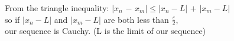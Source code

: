 \documentclass[preview]{standalone}
\begin{document}
\begin{center}
From the triangle inequality: $|$$x_n$ $-$ $x_m$$|$$\leq$$|$$x_n - L$$|$ $+$ $|$$x_m - L$$|$\\so if $|x_n - L|$ and $|x_m - L|$ are both less than $\frac{\varepsilon}{2}$,\\our sequence is Cauchy. (L is the limit of our sequence)
\end{center}
\end{document}
